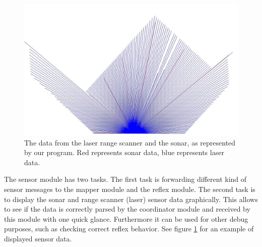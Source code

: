 \begin{figure}
\centering
\includegraphics[width=.7\textwidth]{Sensor.jpg}
\caption{The data from the laser range scanner and the sonar, as represented by
our program. Red represents sonar data, blue represents laser data.}
\label{fig:sonarLaserData}
\end{figure}

The sensor module has two tasks. The first task is forwarding different kind of 
sensor messages to the mapper module and the reflex module. The second task is to
display the sonar and range scanner (laser) sensor data graphically. This allows 
to see if the data is correctly parsed by the coordinator module and received by 
this module with one quick glance. Furthermore it can be used for other debug 
purposes, such as checking correct reflex behavior. See figure \ref{fig:sonarLaserData}
for an example of displayed sensor data. 


